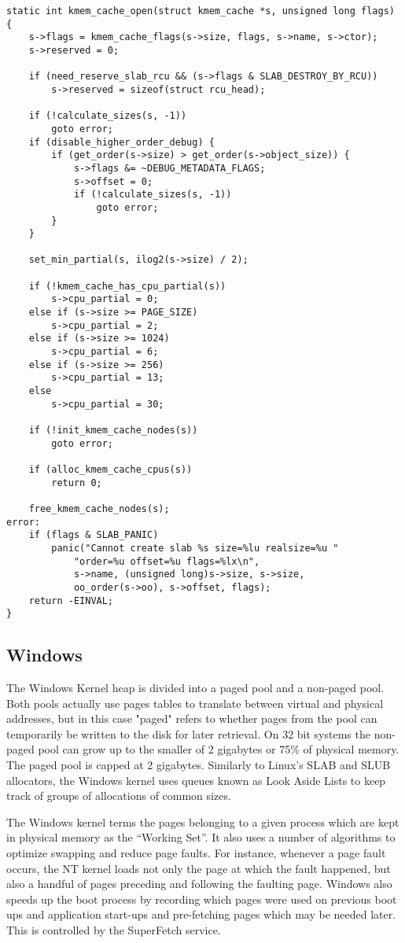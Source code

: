 \documentclass[10pt,conference,draftclsnofoot,onecolumn]{IEEEtran}
\begin{document}
\begin{lstlisting}
static int kmem_cache_open(struct kmem_cache *s, unsigned long flags)
{
	s->flags = kmem_cache_flags(s->size, flags, s->name, s->ctor);
	s->reserved = 0;

	if (need_reserve_slab_rcu && (s->flags & SLAB_DESTROY_BY_RCU))
		s->reserved = sizeof(struct rcu_head);

	if (!calculate_sizes(s, -1))
		goto error;
	if (disable_higher_order_debug) {
		if (get_order(s->size) > get_order(s->object_size)) {
			s->flags &= ~DEBUG_METADATA_FLAGS;
			s->offset = 0;
			if (!calculate_sizes(s, -1))
				goto error;
		}
	}

	set_min_partial(s, ilog2(s->size) / 2);

	if (!kmem_cache_has_cpu_partial(s))
		s->cpu_partial = 0;
	else if (s->size >= PAGE_SIZE)
		s->cpu_partial = 2;
	else if (s->size >= 1024)
		s->cpu_partial = 6;
	else if (s->size >= 256)
		s->cpu_partial = 13;
	else
		s->cpu_partial = 30;

	if (!init_kmem_cache_nodes(s))
		goto error;

	if (alloc_kmem_cache_cpus(s))
		return 0;

	free_kmem_cache_nodes(s);
error:
	if (flags & SLAB_PANIC)
		panic("Cannot create slab %s size=%lu realsize=%u "
			"order=%u offset=%u flags=%lx\n",
			s->name, (unsigned long)s->size, s->size,
			oo_order(s->oo), s->offset, flags);
	return -EINVAL;
}
\end{lstlisting}\cite{5_torvalds_2016}

\subsection{Windows}

The Windows Kernel heap is divided into a paged pool and a non-paged pool. Both pools actually use pages tables to translate between virtual and physical addresses, but in this case "paged" refers to whether pages from the pool can temporarily be written to the disk for later retrieval. On 32 bit systems the non-paged pool can grow up to the smaller of 2 gigabytes or 75\% of physical memory. The paged pool is capped at 2 gigabytes. Similarly to Linux's SLAB and SLUB allocators, the Windows kernel uses queues known as Look Aside Lists to keep track of groups of allocations of common sizes.

The Windows kernel terms the pages belonging to a given process which are kept in physical memory as the ``Working Set''. It also uses a number of algorithms to optimize swapping and reduce page faults. For instance, whenever a page fault occurs, the NT kernel loads not only the page at which the fault happened, but also a handful of pages preceding and following the faulting page. Windows also speeds up the boot process by recording which pages were used on previous boot ups and application start-ups and pre-fetching pages which may be needed later. This is controlled by the SuperFetch service.
\end{document}
